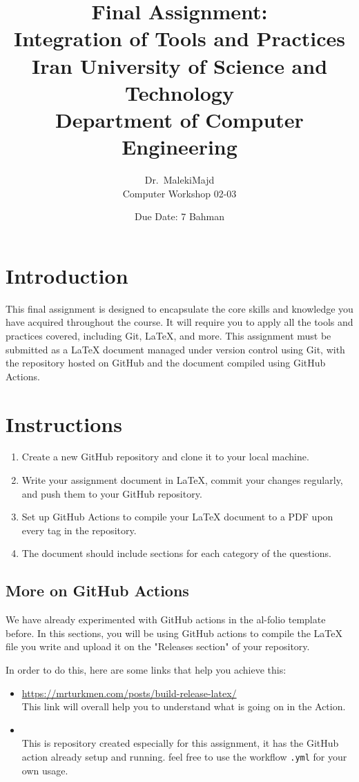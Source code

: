 \documentclass[12pt]{article}
\title{
    \vspace{2in}
    \textbf{Final Assignment:}\\
    \textbf{Integration of Tools and Practices}\\
    \large Iran University of Science and Technology\\
    \large Department of Computer Engineering\\
    \vspace{2in}
}
\author{
    \vspace{0.5in}
    Dr.\ MalekiMajd\\
    Computer Workshop 02-03\\
    \vspace{0.5in}
}
\date{Due Date: 7 Bahman}
\begin{document}
\begin{titlepage}
    \maketitle
    \thispagestyle{empty}
\end{titlepage}

\newpage

\section*{Introduction}
This final assignment is designed to encapsulate the core skills and knowledge you have acquired throughout the course. It will require you to apply all the tools and practices covered, including Git, LaTeX, and more. This assignment must be submitted as a LaTeX document managed under version control using Git, with the repository hosted on GitHub and the document compiled using GitHub Actions.

\section*{Instructions}
\begin{enumerate}
    \item Create a new GitHub repository and clone it to your local machine.
    \item Write your assignment document in LaTeX, commit your changes regularly, and push them to your GitHub repository.
    \item Set up GitHub Actions to compile your LaTeX document to a PDF upon every tag in the repository.
    \item The document should include sections for each category of the questions.
\end{enumerate}

\subsection*{More on GitHub Actions}
We have already experimented with GitHub actions in the al-folio template before. In this sections, you will be using GitHub actions to compile the LaTeX file you write and upload it on the "Releases section" of your repository.

In order to do this, here are some links that help you achieve this:
\begin{itemize}
    \item \url{https://mrturkmen.com/posts/build-release-latex/} \\
        This link will overall help you to understand what is going on in the Action.
    \item \url{} \\
        This is repository created especially for this assignment, it has the GitHub action already setup and running. feel free to use the workflow \texttt{.yml}
        for your own usage.
\end{itemize}
\end{document}

